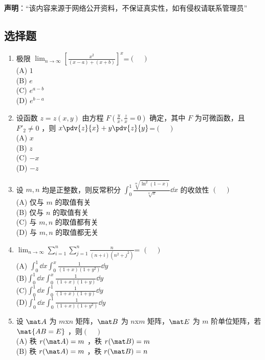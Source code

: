 
\textbf{声明}：“该内容来源于网络公开资料，不保证真实性，如有侵权请联系管理员”

\subsection{选择题}
\begin{enumerate}
\item 极限  $\displaystyle \lim_{n\to\infty}[\frac{x^2}{(x-a)+(x+b)}]^x$=$(\quad )$\\
(A) $1$\\
(B) $e$\\
(C) $e^{a-b}$\\
(D) $e^{b-a}$
\item  设函数 $z=z(x,y)$ 由方程 $\displaystyle F(\frac{y}{x},\frac{z}{x}=0)$ 确定，其中 $F$ 为可微函数，且 $F'_2 \neq0$ ，则  $\displaystyle x \pdv{z}{x}+y\pdv{z}{y}$=$(\quad )$\\
(A)  $x$\\
(B)  $z$\\
(C) $-x$\\
(D)  $-z$
\item 设 $m,n$ 均是正整数，则反常积分 $\displaystyle \int_0^1 \frac{\sqrt[m]{\ln^2(1-x)}}{\sqrt[n]{x}}\dd{x}$ 的收敛性 $(\quad )$\\
(A) 仅与 $m$ 的取值有关\\
(B) 仅与 $n$ 的取值有关\\
(C)  与 $m,n$ 的取值都有关\\
(D)  与 $m,n$ 的取值都无关
\item $\displaystyle \lim_{n\to\infty} \sum_{i=1}^n \sum_{j=1}^n \frac{n}{(n+i)(n^2+j^2)}$= $(\quad )$\\
(A) $\displaystyle \int_{0}^{1}\dd{x}\int_{0}^{x} \frac{1}{(1+x)(1+y^2)}\dd{y}$\\
(B)$\displaystyle \int_{0}^{1}\dd{x}\int_{0}^{x} \frac{1}{(1+x)(1+y)}\dd{y}$\\
(C)$\displaystyle \int_{0}^{1}\dd{x}\int_{0}^{1} \frac{1}{(1+x)(1+y)}\dd{y}$\\
(D)$\displaystyle \int_{0}^{1}\dd{x}\int_{0}^{1} \frac{1}{(1+x)(1+y^2)}\dd{y}$
\item 设 $\mat A$ 为 $m$x$n$ 矩阵，$\mat B$  为 $n$x$m$  矩阵，$\mat E$  为  $m$ 阶单位矩阵，若 $\mat {AB=E}$ ，则$(\quad )$\\
(A) 秩 $r(\mat A)=m$ ，秩  $r(\mat  B)=m$ \\
(B) 秩 $r(\mat A)=m$ ，秩  $r( \mat B)=n$ \\

\end{enumerate}
